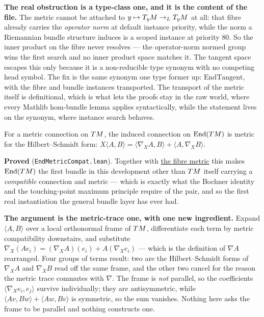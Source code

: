 \begin{lemma}
  \textbf{The real obstruction is a type-class one, and it is the content of the file.} The
  metric cannot be attached to $y \mapsto T_yM \to_L T_yM$ at all: that fibre already carries
  the \emph{operator norm} at default instance priority, while the norm a Riemannian bundle
  structure induces is a scoped instance at priority $80$. So the inner product on the fibre
  never resolves --- the operator-norm normed group wins the first search and no inner product
  space matches it. The tangent space escapes this only because it is a non-reducible type
  synonym with no competing head symbol. The fix is the same synonym one type former up:
  $\mathrm{EndTangent}$, with the fibre and bundle instances transported. The transport of the
  metric itself is definitional, which is what lets the proofs stay in the raw world, where
  every Mathlib hom-bundle lemma applies syntactically, while the statement lives on the
  synonym, where instance search behaves.
\end{lemma}

\begin{lemma}
  \label{lem:end-metric-compat}
  \leanok
  For a metric connection on $TM$, the induced connection on $\mathrm{End}(TM)$ is metric
  for the Hilbert--Schmidt form:
  $X\langle A,B\rangle = \langle \nabla_X A, B\rangle + \langle A, \nabla_X B\rangle$.

  \textbf{Proved} (\texttt{EndMetricCompat.lean}). Together with
  \hyperref[lem:end-bundle-metric]{the fibre metric} this makes $\mathrm{End}(TM)$ the first
  bundle in this development other than $TM$ itself carrying a \emph{compatible} connection
  and metric --- which is exactly what the Bochner identity and the touching-point maximum
  principle require of the pair, and so the first real instantiation the general bundle layer
  has ever had.

  \textbf{The argument is the metric-trace one, with one new ingredient.} Expand
  $\langle A,B\rangle$ over a local orthonormal frame of $TM$, differentiate each term by
  metric compatibility downstairs, and substitute
  $\nabla_X(A e_i) = (\nabla_X A)(e_i) + A(\nabla_X e_i)$ --- which is the definition of
  $\nabla A$ rearranged. Four groups of terms result: two are the Hilbert--Schmidt forms of
  $\nabla_X A$ and $\nabla_X B$ read off the same frame, and the other two cancel for the
  reason the metric trace commutes with $\nabla$. The frame is \emph{not} parallel, so the
  coefficients $\langle \nabla_X e_i, e_j\rangle$ survive individually; they are
  antisymmetric, while $\langle A v, B w\rangle + \langle A w, B v\rangle$ is symmetric, so
  the sum vanishes. Nothing here asks the frame to be parallel and nothing constructs one.
\end{lemma}

